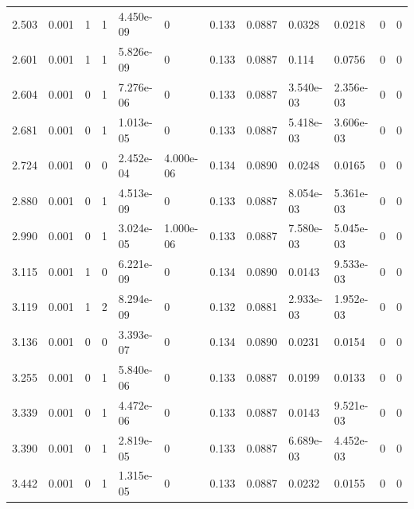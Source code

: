 \documentclass[preview]{standalone}
\begin{document}
{{\begin{tabular}{L{1.2cm}C{1.2cm} C{0.3cm}C{0.5cm} C{1.4cm}C{1.4cm} C{1.4cm}C{1.4cm} C{1.6cm}C{1.6cm} C{1.6cm}C{1.6cm}}
  2.503  &  0.001  & 1     &  1 &  4.450e-09  & 0  &  0.133&   0.0887& 0.0328 & 0.0218   &  0 & 0  \\ 
  2.601  &  0.001  & 1     &  1 &  5.826e-09  & 0  &  0.133&   0.0887& 0.114 & 0.0756   &  0 & 0  \\ 
  2.604  &  0.001  & 0     &  1 &  7.276e-06  & 0  &  0.133&   0.0887& 3.540e-03 & 2.356e-03   &  0 & 0  \\ 
  2.681  &  0.001  & 0     &  1 &  1.013e-05  & 0  &  0.133&   0.0887& 5.418e-03 & 3.606e-03   &  0 & 0  \\ 
  2.724  &  0.001  & 0     &  0 &  2.452e-04  & 4.000e-06  &  0.134&   0.0890& 0.0248 & 0.0165   &  0 & 0  \\ 
  2.880  &  0.001  & 0     &  1 &  4.513e-09  & 0  &  0.133&   0.0887& 8.054e-03 & 5.361e-03   &  0 & 0  \\ 
  2.990  &  0.001  & 0     &  1 &  3.024e-05  & 1.000e-06  &  0.133&   0.0887& 7.580e-03 & 5.045e-03   &  0 & 0  \\ 
  3.115  &  0.001  & 1     &  0 &  6.221e-09  & 0  &  0.134&   0.0890& 0.0143 & 9.533e-03   &  0 & 0  \\ 
  3.119  &  0.001  & 1     &  2 &  8.294e-09  & 0  &  0.132&   0.0881& 2.933e-03 & 1.952e-03   &  0 & 0  \\ 
  3.136  &  0.001  & 0     &  0 &  3.393e-07  & 0  &  0.134&   0.0890& 0.0231 & 0.0154   &  0 & 0  \\ 
  3.255  &  0.001  & 0     &  1 &  5.840e-06  & 0  &  0.133&   0.0887& 0.0199 & 0.0133   &  0 & 0  \\ 
  3.339  &  0.001  & 0     &  1 &  4.472e-06  & 0  &  0.133&   0.0887& 0.0143 & 9.521e-03   &  0 & 0  \\ 
  3.390  &  0.001  & 0     &  1 &  2.819e-05  & 0  &  0.133&   0.0887& 6.689e-03 & 4.452e-03   &  0 & 0  \\ 
  3.442  &  0.001  & 0     &  1 &  1.315e-05  & 0  &  0.133&   0.0887& 0.0232 & 0.0155   &  0 & 0  \\ 
\hline 
\end{tabular} 

}}
\end{document}
